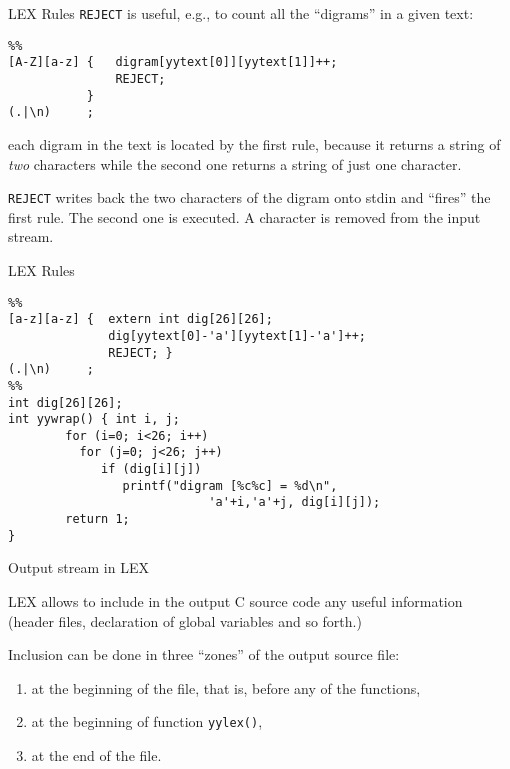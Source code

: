 \begin{frame}[fragile]{LEX Rules}
\noindent
{\tt REJECT} is useful, e.g., to count all the
``digrams'' in a given text:


\vspace{20pt}

\begin{verbatim}
%%
[A-Z][a-z] {   digram[yytext[0]][yytext[1]]++;
               REJECT;
           }
(.|\n)     ;
\end{verbatim}


\vspace{20pt}

each digram in the text is located by the first rule, because
it returns a string of \emph{two\/} characters while the second
one returns a string of just one character.


\vspace{20pt}

{\tt REJECT} writes back the two characters of the digram onto stdin
and ``fires'' the first rule. The second one is executed.
A character is removed from the input stream.


\end{frame}
\begin{frame}[fragile]{LEX Rules}
\label{digram1}
\begin{verbatim}
%%
[a-z][a-z] {  extern int dig[26][26];
              dig[yytext[0]-'a'][yytext[1]-'a']++;
              REJECT; }
(.|\n)     ;
%%
int dig[26][26];
int yywrap() { int i, j;
        for (i=0; i<26; i++)
          for (j=0; j<26; j++)
             if (dig[i][j])
                printf("digram [%c%c] = %d\n",
                            'a'+i,'a'+j, dig[i][j]);
        return 1;
}
\end{verbatim}


\end{frame}
\begin{frame}[fragile]{Output stream in LEX}

LEX allows to include in the output C source code
any useful information (header files, declaration of
global variables and so forth.)


\vspace{20pt}

Inclusion can be done in three ``zones'' of the output
source file:
\begin{enumerate}
\item at the beginning of the file, that is, before any of the functions,
\item at the beginning of function {\tt yylex()},
\item at the end of the file.
\end{enumerate}


\end{frame}
